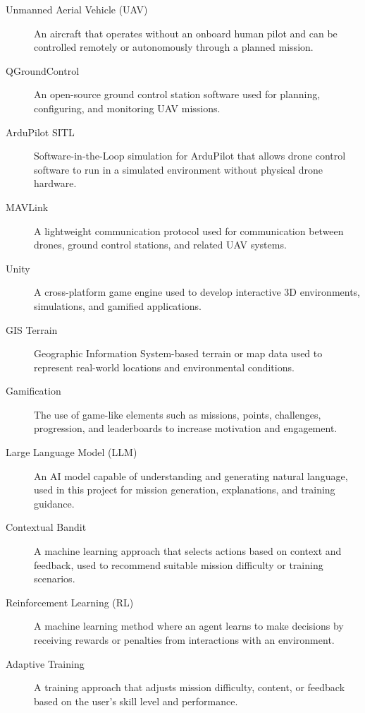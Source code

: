 \begin{description}
    \item[Unmanned Aerial Vehicle (UAV)] An aircraft that operates without an onboard human pilot and can be controlled remotely or autonomously through a planned mission.
    \item[QGroundControl]
    An open-source ground control station software used for planning, configuring, and monitoring UAV missions.
    \item[ArduPilot SITL]
    Software-in-the-Loop simulation for ArduPilot that allows drone control software to run in a simulated environment without physical drone hardware.
    \item[MAVLink]
    A lightweight communication protocol used for communication between drones, ground control stations, and related UAV systems.
    \item[Unity]
    A cross-platform game engine used to develop interactive 3D environments, simulations, and gamified applications.
    \item[GIS Terrain]
    Geographic Information System-based terrain or map data used to represent real-world locations and environmental conditions.
    \item[Gamification]
    The use of game-like elements such as missions, points, challenges, progression, and leaderboards to increase motivation and engagement.
    \item[Large Language Model (LLM)]
    An AI model capable of understanding and generating natural language, used in this project for mission generation, explanations, and training guidance.
    \item[Contextual Bandit]
    A machine learning approach that selects actions based on context and feedback, used to recommend suitable mission difficulty or training scenarios.
    \item[Reinforcement Learning (RL)]
    A machine learning method where an agent learns to make decisions by receiving rewards or penalties from interactions with an environment.
    \item[Adaptive Training]
    A training approach that adjusts mission difficulty, content, or feedback based on the user’s skill level and performance.
\end{description}